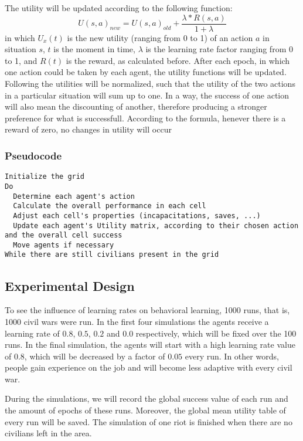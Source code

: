 The utility will be updated according to the following function:
$$ U(s,a)_{new} = U(s,a)_{old} + \frac{\lambda * R(s,a)}{1+\lambda} $$
in which $U_x(t)$ is the new utility (ranging from 0 to 1) of an action $a$ in situation $s$, $t$ is the moment in time, $\lambda$ is the learning rate factor ranging from 0 to 1, and $R(t)$ is the reward, as calculated before.
After each epoch, in which one action could be taken by each agent, the utility functions will be updated.
Following the utilities will be normalized, such that the utility of the two actions in a particular situation will sum up to one.
In a way, the success of one action will also mean the discounting of another, therefore producing a stronger preference for what is successfull.
According to the formula, henever there is a reward of zero, no changes in utility will occur

\subsubsection{Pseudocode}
\begin{lstlisting}
Initialize the grid
Do
  Determine each agent's action 
  Calculate the overall performance in each cell
  Adjust each cell's properties (incapacitations, saves, ...)
  Update each agent's Utility matrix, according to their chosen action and the overall cell success
  Move agents if necessary
While there are still civilians present in the grid
\end{lstlisting}

\subsection{Experimental Design}
To see the influence of learning rates on behavioral learning, 1000 runs, that is, 1000 civil wars were run.
In the first four simulations the agents receive a learning rate of $0.
8$, $0.
5$, $0.
2$ and $0.
0$ respectively, which will be fixed over the 100 runs.
In the final simulation, the agents will start with a high learning rate value of $0.
8$, which will be decreased by a factor of $0.
05$ every run.
In other words, people gain experience on the job and will become less adaptive with every civil war.


During the simulations, we will record the global success value of each run and the amount of epochs of these runs.
Moreover, the global mean utility table of every run will be saved.
The simulation of one riot is finished when there are no civilians left in the area.



